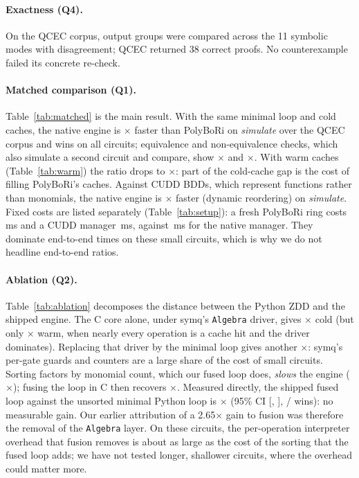 \documentclass[10pt,a4paper]{article}
\theoremstyle{definition}
\newcommand{\symq}{\textsf{symq}}
\begin{document}
\paragraph{Exactness (Q4).} On the QCEC corpus, \QGroups{} output groups were compared
across the 11 symbolic modes with \QDisagree{} disagreement; QCEC returned 38 correct proofs.
\BlindExactness{} No counterexample failed its concrete re-check.

\paragraph{Matched comparison (Q1).} Table~\ref{tab:matched} is the main result. With the same
minimal loop and cold caches, the native engine is \QPBSim$\times$ faster than PolyBoRi on
\emph{simulate} over the QCEC corpus and wins on all \QPBSimN{} circuits; equivalence and
non-equivalence checks, which also simulate a second circuit and compare, show
\QPBEq$\times$ and \QPBNeq$\times$. With warm caches (Table~\ref{tab:warm}) the ratio drops to
\QPBSimWarm$\times$: part of the cold-cache gap is the cost of filling PolyBoRi's caches.
Against CUDD BDDs, which represent functions rather than monomials, the native engine is
\QBDDSim$\times$ faster (dynamic reordering) on \emph{simulate}. Fixed costs are listed
separately (Table~\ref{tab:setup}): a fresh PolyBoRi ring costs \SetupPB\,ms and a CUDD
manager \SetupBDD\,ms, against \SetupNative\,ms for the native manager. They dominate
end-to-end times on these small circuits, which is why we do not headline end-to-end ratios.

\paragraph{Ablation (Q2).} Table~\ref{tab:ablation} decomposes the distance between the
Python ZDD and the shipped engine. The C core alone, under \symq{}'s \texttt{Algebra} driver,
gives \QCoreSim$\times$ cold (but only \QCoreSimWarm$\times$ warm, when nearly every operation
is a cache hit and the driver dominates). Replacing that driver by the minimal loop gives
another \QDriverSim$\times$: \symq{}'s per-gate guards and counters are a large share of the
cost of small circuits. Sorting factors by monomial count, which our fused loop does,
\emph{slows} the engine (\QSortingSim$\times$); fusing the loop in C then recovers
\QFusionSim$\times$. Measured directly, the shipped fused loop against the unsorted minimal
Python loop is \QFusedVsLoopSim$\times$ (95\% CI [\QFusedVsLoopSimLo, \QFusedVsLoopSimHi],
\QFusedVsLoopSimWins/\QFusedVsLoopSimN{} wins): no measurable gain. Our earlier attribution
of a 2.65$\times$ gain to fusion was therefore the removal of the \texttt{Algebra} layer. On
these circuits, the per-operation interpreter overhead that fusion removes is about as large
as the cost of the sorting that the fused loop adds; we have not tested longer, shallower
circuits, where the overhead could matter more.
\end{document}
